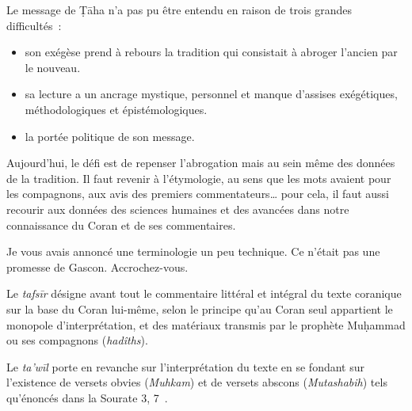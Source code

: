 Le message de Ṭāha n'a pas pu être entendu en raison de trois grandes
difficultés~:
\begin{itemize}
    \item son exégèse prend à rebours la tradition qui consistait à abroger
l'ancien par le nouveau.
\item sa lecture a un ancrage mystique, personnel et manque d'assises
exégétiques, méthodologiques et épistémologiques.
\item la portée politique de son message.
\end{itemize}


Aujourd'hui, le défi est de repenser l'abrogation mais au sein même des
données de la tradition. Il faut revenir à l'étymologie, au sens que les
mots avaient pour les compagnons, aux avis des premiers
commentateurs\ldots{} pour cela, il faut aussi recourir aux données des
sciences humaines et des avancées dans notre connaissance du Coran et de
ses commentaires.




Je vous avais annoncé une terminologie un peu technique. Ce n'était pas
une promesse de Gascon. Accrochez-vous.

\begin{Def}[tafsīr]
Le \emph{tafsīr} désigne avant tout le commentaire littéral et intégral
du texte coranique sur la base du Coran lui-même, selon le principe
qu'au Coran seul appartient le monopole d'interprétation, et des
matériaux transmis par le prophète Muḥammad ou ses compagnons
(\emph{hadîths}).
\end{Def}

\begin{Def}
Le \emph{ta'wīl} porte en revanche sur l'interprétation du texte en se
fondant sur l'existence de versets obvies (\textit{Muhkam}) et de versets abscons (\textit{Mutashabih}) tels
qu'énoncés dans la Sourate 3, 7~.
\end{Def}


